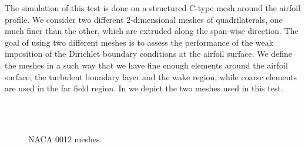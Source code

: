 The simulation of this test is done on a structured C-type mesh around the airfoil profile. We consider two different 2-dimensional meshes of quadrilaterals, one much finer than the other, which are extruded along the span-wise direction. The goal of using two different meshes is to assess the performance of the weak imposition of the Dirichlet boundary conditions at the airfoil surface. We define the meshes in a such way that we have fine enough elements around the airfoil surface, the turbulent boundary layer and the wake region, while coarse elements are used in the far field region. In  we depict the two meshes used in this test.
\begin{figure}[h!]
  \centering
  \\
  \\
  \caption{NACA 0012 meshes.}
  \label{fig-NACA_meshes}
\end{figure}

